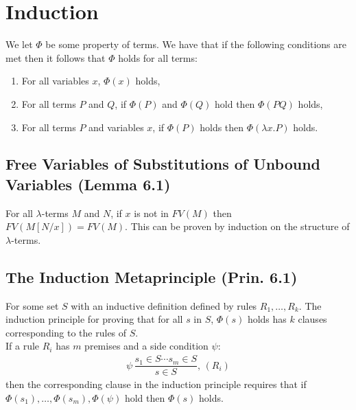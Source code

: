 \section{Induction}

We let $\Phi$ be some property of terms. We have that
if the following conditions are met then it follows that
$\Phi$ holds for all terms: \begin{enumerate}
    \item For all variables $x$, $\Phi(x)$ holds,
    \item For all terms $P$ and $Q$, if $\Phi(P)$ and
        $\Phi(Q)$ hold then $\Phi(PQ)$ holds,
    \item For all terms $P$ and variables $x$, if
        $\Phi(P)$ holds then $\Phi(\lambda x.P)$ holds.
\end{enumerate}

\subsection{Free Variables of Substitutions of Unbound Variables 
    (Lemma 6.1)}

For all $\lambda$-terms $M$ and $N$, if $x$ is not in $FV(M)$
then $FV(M[N / x]) = FV(M)$. This can be proven by induction
on the structure of $\lambda$-terms.

\subsection{The Induction Metaprinciple (Prin. 6.1)}

For some set $S$ with an inductive definition defined by
rules $R_1, \ldots, R_k$. The induction principle for proving
that for all $s$ in $S$, $\Phi(s)$ holds has $k$ clauses
corresponding to the rules of $S$.
\\[\baselineskip]
If a rule $R_i$ has $m$ premises and a side condition $\psi$:
\begin{align*}
    \psi \, \dfrac{s_1 \in S \cdots s_m \in S}{s \in S}, \, (R_i)
\end{align*} then the corresponding clause in the induction
principle requires that if 
\linebreak $\Phi(s_1), \ldots, \Phi(s_m), \Phi(\psi)$
hold then $\Phi(s)$ holds.
